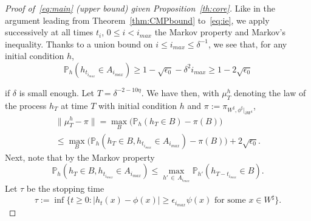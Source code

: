 \documentclass[10pt]{amsart}
\theoremstyle{definition}\newtheorem{defi}[theo]{Definition}\newtheorem{rema}[theo]{Remark}\newtheorem{exam}[theo]{Example}\newtheorem{exem}[theo]{Example}\newtheorem{nota}[theo]{Notation}
\renewcommand{\P}{\mathbb{P}}
\renewcommand{\d}{{\sharp }}
\begin{document}
\begin{proof}[Proof of~\eqref{eq:main} (upper bound) given Proposition~\ref{th:core}]
Like in the argument leading from Theorem~\ref{thm:CMPbound} to~\eqref{eq:ie}, we apply successively at all times $t_i$, $ 0 \leq i < i_{max}$ the Markov property and Markov's inequality. Thanks to a union bound on $i\le i_{max}\le \delta^{-1}$, we see that, for any initial condition $h$,
\begin{equation}
\P_h(h_{t_{i_{max}}} \in A_{i_{max}}) \geq 1 - \sqrt{\epsilon_0} - \delta^2 i_{max}\geq 1 - 2 \sqrt{\epsilon_0}
\end{equation}

if $\delta$ is small enough. Let $T=\delta^{-2-10\eta}$. We have then, with $\mu_T^h$ denoting the law of the process $h_T$ at time $T$ with initial condition $h$ and $\pi:=\pi_{W^\d,\phi^\d|_{\partial W^\d}}$,
\begin{multline}
\|\mu_T^h-\pi\|= \max_B\Big(\P_h(h_T\in B)-\pi(B)\Big)\\\le \max_B\Big(\P_h\left(h_T\in B, h_{t_{i_{max}}} \in A_{i_{max}}\right)-\pi(B)\Big)+2 \sqrt{\epsilon_0}.
\end{multline}
Next, note that by the Markov property
\begin{equation}
\P_h\left(h_T\in B, h_{t_{i_{max}}} \in A_{i_{max}}\right)\le \max_{h'\,\in\,A_{i_{max}}}\P_{h'}\left(h_{T-t_{i_{max}}}\in B\right).
\end{equation}
Let $\tau$ be the stopping time
\begin{equation}\label{eq:tau}
\tau:=\inf\big\{t\ge0:|h_t(x)-\phi(x)|\geq \epsilon_{i_{max}}\psi(x) \text{ for some } x\in W^\d\big\}.
\end{equation}


\end{proof}
\end{document}
